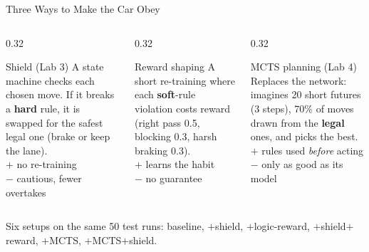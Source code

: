 \documentclass[aspectratio=169,10pt,xcolor=table]{beamer}
\begin{document}
\begin{frame}{Three Ways to Make the Car Obey}
  \begin{columns}[T]
    \begin{column}{0.32\textwidth}
      \begin{block}{\textcolor{hardc}{Shield} \normalfont\color{muted}(Lab 3)}
        \footnotesize A state machine checks each chosen move. If it breaks a \textbf{hard} rule, it is swapped for the
        safest legal one (brake or keep the lane).\\[0.4em]
        \textcolor{softc}{$+$} no re-training\\\textcolor{hardc}{$-$} cautious, fewer overtakes
      \end{block}
    \end{column}
    \begin{column}{0.32\textwidth}
      \begin{block}{\textcolor{softc}{Reward shaping}}
        \footnotesize A short re-training where each \textbf{soft}-rule violation costs reward (right pass 0.5,
        blocking 0.3, harsh braking 0.3).\\[0.4em]
        \textcolor{softc}{$+$} learns the habit\\\textcolor{hardc}{$-$} no guarantee
      \end{block}
    \end{column}
    \begin{column}{0.32\textwidth}
      \begin{block}{\textcolor{cblue}{MCTS planning} \normalfont\color{muted}(Lab 4)}
        \footnotesize Replaces the network: imagines 20 short futures (3 steps), 70\% of moves drawn from the
        \textbf{legal} ones, and picks the best.\\[0.4em]
        \textcolor{softc}{$+$} rules used \emph{before} acting\\\textcolor{hardc}{$-$} only as good as its model
      \end{block}
    \end{column}
  \end{columns}
  \vspace{0.8em}
  \centering
  {\small Six setups on the same 50 test runs: baseline, $+$shield, $+$logic-reward, $+$shield$+$reward, $+$MCTS,
  $+$MCTS$+$shield.}
\end{frame}
\end{document}
